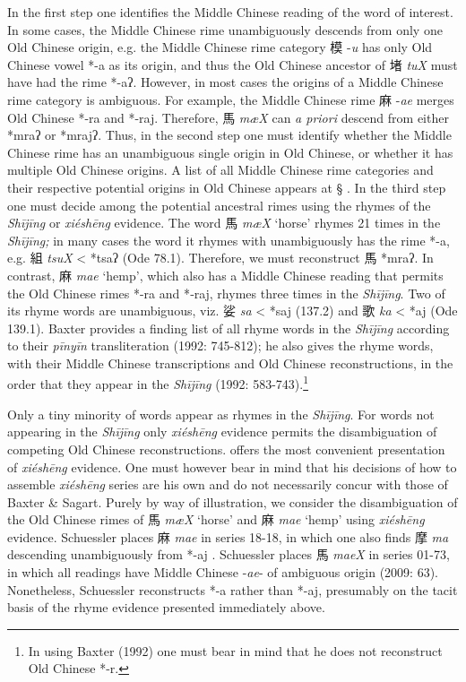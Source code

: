 In the first step one identifies the Middle Chinese reading of the word
of interest. In some cases, the Middle Chinese rime unambiguously
descends from only one Old Chinese origin, e.g. the Middle Chinese rime
category 模 -\emph{u} has only Old Chinese vowel *-a as its origin, and
thus the Old Chinese ancestor of 堵 \emph{tuX} must have had the rime
*-aʔ. However, in most cases the origins of a Middle Chinese rime
category is ambiguous. For example, the Middle Chinese rime 麻
-\emph{ae} merges Old Chinese *-ra and *-raj. Therefore, 馬 \emph{mæX}
can \emph{a priori} descend from either *mr{}aʔ or *mr{}ajʔ. Thus, in the
second step one must identify whether the Middle Chinese rime has an
unambiguous single origin in Old Chinese, or whether it has multiple Old
Chinese origins. A list of all Middle Chinese rime categories and their
respective potential origins in Old Chinese appears at § . In the third
step one must decide among the potential ancestral rimes using the
rhymes of the \emph{Shījīng} or  \emph{xiéshēng} evidence. The word 馬
\emph{mæX} `horse' rhymes 21 times in the \emph{Shījīng;} in many cases
the word it rhymes with unambiguously has the rime *-a, e.g. 組
 \emph{tsuX} \textless{} *ts{}aʔ (Ode 78.1). Therefore, we must
reconstruct 馬 *mr{}aʔ. In contrast, 麻  \emph{mae} `hemp', which also has
a Middle Chinese reading that permits the Old Chinese rimes *-ra and
*‑raj, rhymes three times in the \emph{Shījīng}. Two of its rhyme words
are unambiguous, viz. 娑 \emph{sa} \textless{} *s{}aj (137.2) and 歌
 \emph{ka} \textless{} *{}aj (Ode 139.1). Baxter provides a finding list
of all rhyme words in the \emph{Shījīng } according to their
 \emph{pīnyīn} transliteration (1992: 745-812); he also gives the rhyme
words, with their Middle Chinese transcriptions and Old Chinese
reconstructions, in the order that they appear in the \emph{Shījīng
}(1992: 583-743).\footnote{In using Baxter (1992) one must bear in mind
  that he does not reconstruct Old Chinese *-r. }

Only a tiny minority of words appear as rhymes in the \emph{Shījīng}.
For words not appearing in the \emph{Shījīng} only  \emph{xiéshēng}
evidence permits the disambiguation of competing Old Chinese
re­con­struc­tions. 
\citet[]{Schuessler2009minimal}
offers the most convenient
presentation of  \emph{xiéshēng} evidence. One must however bear in mind
that his decisions of how to assemble  \emph{xiéshēng} series are his own
and do not necessarily concur with those of Baxter \& Sagart. Purely by
way of illustration, we consider the disambiguation of the Old Chinese
rimes of 馬 \emph{mæX} `horse' and 麻 \emph{mae} `hemp' using
 \emph{xiéshēng} evidence. Schuessler places 麻  \emph{mae} in series
18-18, in which one also finds 摩 \emph{ma} descending unambiguously
from *-aj 
\citeyearpar[217-218]{Schuessler2009minimal}. Schuessler places 馬  \emph{maeX} in series
01-73, in which all readings have Middle Chinese -\emph{ae}- of
ambiguous origin (2009: 63). Nonetheless, Schuessler reconstructs *-a
rather than *-aj, presumably on the tacit basis of the rhyme evidence
presented immediately above.

